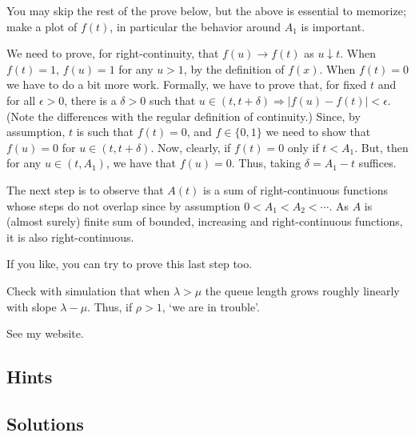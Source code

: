 \begin{question}
\begin{solution}
    You may skip the rest of the prove below, but the above is
    essential to memorize; make a plot of $f(t)$, in particular the
    behavior around $A_1$ is important.

    We need to prove, for right-continuity, that $f(u)\to f(t) $ as
    $u\downarrow t$. When $f(t)=1$, $f(u)=1$ for any $u>1$, by the
    definition of $f(x)$. When $f(t)=0$ we have to do a bit more
    work. Formally, we have to prove that, for fixed $t$ and for all
    $\epsilon > 0$, there is a $\delta>0$ such that
    $u\in(t, t+\delta) \Rightarrow |f(u) -f(t)| < \epsilon$. (Note the
    differences with the regular definition of continuity.) Since, by
    assumption, $t$ is such that $f(t)=0$, and $f\in\{0,1\}$ we need
    to show that $f(u)=0$ for $u\in(t, t+\delta)$. Now, clearly, if
    $f(t)=0$ only if $t < A_1$.  But, then for any $u\in(t, A_1)$, we
    have that $f(u) = 0$. Thus, taking $\delta = A_1 - t$ suffices.

    The next step is to observe that $A(t)$ is a sum of
    right-continuous functions whose steps do not overlap since by
    assumption $0<A_1 < A_2 < \cdots$. As $A$ is (almost surely)
    finite sum of bounded, increasing and right-continuous functions,
    it is also right-continuous.

    If you like, you can try to prove this last step too. 


 \end{solution}
\end{question}


\begin{question}
  Check with simulation that when $\lambda > \mu$ the queue length
  grows roughly linearly with slope $\lambda - \mu$.  Thus, if
  $\rho>1$, `we are in trouble'.
  \begin{solution}
    See my website. 
  \end{solution}
\end{question}

\subsection*{Hints}

\subsection*{Solutions}

\clearpage

